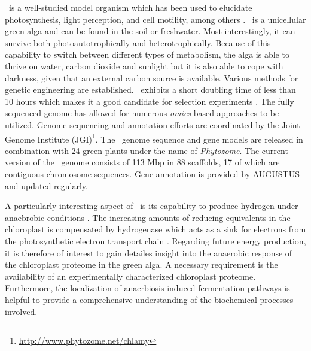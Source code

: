 \chlre~is a well-studied model organism which has been used to elucidate 
photosynthesis, light perception, and cell motility, among others 
\citep{Harris2001}.
\cre~is a unicellular green alga and can be found in the soil or freshwater.
Most interestingly, it can survive both photoautotrophically and 
heterotrophically.
Because of this capability to switch between different types of metabolism, 
the alga is able to thrive on water, carbon dioxide and sunlight but it is
also able to cope with darkness, given that an external carbon source is 
available.
Various methods for genetic engineering are established.
\cre~exhibits a short doubling time of less than 10 hours which makes it 
a good candidate for selection experiments \citep{Dent2001}.
The fully sequenced genome \citep{Merchant2007} has allowed for numerous 
{\em omics}-based approaches to be utilized.
Genome sequencing and annotation efforts are coordinated by the Joint Genome 
Institute (JGI)\footnote{\href{http://www.phytozome.net/chlamy}{http://www.phytozome.net/chlamy}}.
The \cre~genome sequence and gene models are released in combination with
24 green plants under the name of {\em Phytozome}.
The current version of the \cre~genome consists of 113 Mbp in 88 scaffolds,
17 of which are contiguous chromosome sequences.
Gene annotation is provided by AUGUSTUS and updated regularly.

A particularly interesting aspect of \cre~is its capability to produce
hydrogen under anaebrobic conditions \citep{Greenbaum1982}.
The increasing amounts of reducing equivalents in the chloroplast is
compensated by hydrogenase which acts as a sink for electrons from
the photosynthetic electron transport chain \citep{Hemschemeier2011}.
Regarding future energy production, it is therefore of interest to gain 
detailes insight into the anaerobic response of the chloroplast proteome in
the green alga.
A necessary requirement is the availability of an experimentally characterized
chloroplast proteome. 
Furthermore, the localization of anaerbiosis-induced fermentation pathways
is helpful to provide a comprehensive understanding of the biochemical 
processes involved.

% 
% 
% 
